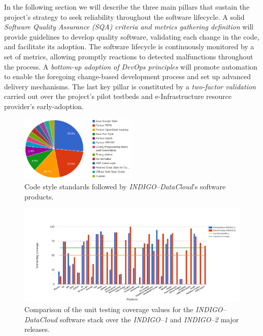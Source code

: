 \documentclass[journal]{IEEEtran}
\begin{document}
In the following section we will describe the three main pillars that sustain the project's strategy to seek reliability throughout the 
software lifecycle. A solid \textit{Software Quality Assurance (SQA) criteria
and metrics gathering definition} will provide guidelines to develop quality 
software, validating each change in the code, and facilitate its adoption. The software lifecycle is continuously monitored
by a set of metrics, allowing promptly reactions to detected malfunctions throughout the
process. A \textit{bottom-up adoption of DevOps principles} will promote automation to enable
the foregoing change-based development process and set up advanced delivery mechanisms.
The last key pillar is constituted by a \textit{two-factor validation} carried out over the project's pilot testbeds and
e-Infrastructure resource provider's early-adoption.



\begin{figure}[ht]
\centering
\includegraphics[width=0.5\textwidth]{images/codestyle.png}
\caption{Code style standards followed by {\sl INDIGO--DataCloud}'s software products.}
\label{fig:fig_codestyle}
\end{figure}

\begin{figure}[ht]
\centering
\includegraphics[width=\textwidth]{images/unittest.png}
\caption{Comparison of the unit testing coverage values for the {\sl INDIGO--DataCloud} software stack over the {\sl INDIGO--1} and {\sl INDIGO--2} major releases.}
\label{fig:fig_unittest}
\end{figure}
\end{document}
